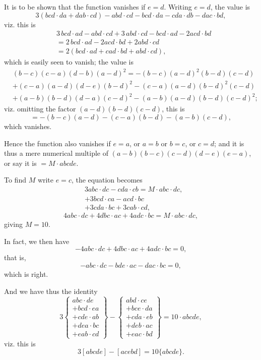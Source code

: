 \documentclass[12pt,a4paper]{article}
\theoremstyle{cayley}
\theoremstyle{definition}
\numberwithin{equation}{section}
\begin{document}
It is to be shown that the function vanishes if $e = d$. Writing $e = d$, the value is
\[
3(bcd \cdot da + dab \cdot cd) - abd \cdot cd - bcd \cdot da - cda \cdot db - dac \cdot bd,
\]
viz. this is
\begin{align*}
&3\, bcd \cdot ad - abd \cdot cd + 3\, abd \cdot cd - bcd \cdot ad - 2acd \cdot bd \\
&= 2\, bcd \cdot ad - 2acd \cdot bd + 2abd \cdot cd \\
&= 2(bcd \cdot ad + cad \cdot bd + abd \cdot cd),
\end{align*}
which is easily seen to vanish; the value is
\begin{align*}
&(b - c)(c - a)(d - b)(a - d)^2 = -(b - c)(a - d)^2(b - d)(c - d) \\
&+ (c - a)(a - d)(d - e)(b - d)^2 - (c - a)(a - d)(b - d)^2(c - d) \\
&+ (a - b)(b - d)(d - a)(c - d)^2 - (a - b)(a - d)(b - d)(c - d)^2;
\end{align*}
viz. omitting the factor $(a - d)(b - d)(c - d)$, this is
\[
= -(b - c)(a - d) - (c - a)(b - d) - (a - b)(c - d),
\]
which vanishes.

Hence the function also vanishes if $e = a$, or $a = b$ or $b = c$, or $c = d$; and it is thus a mere numerical multiple of $(a - b)(b - c)(c - d)(d - e)(e - a)$, or say it is $= M \cdot abcde$.

To find $M$ write $e = c$, the equation becomes
\begin{align*}
&3abc \cdot dc - cda \cdot cb = M \cdot abc \cdot dc, \\
&+ 3bcd \cdot ca - acd \cdot bc \\
&+ 3cda \cdot bc + 3cab \cdot cd,
\end{align*}
\[
4abc \cdot dc + 4dbc \cdot ac + 4adc \cdot bc = M \cdot abc \cdot dc,
\]
giving $M = 10$.

In fact, we then have
\[
-4abc \cdot dc + 4dbc \cdot ac + 4adc \cdot bc = 0,
\]
that is,
\[
-abc \cdot dc - bde \cdot ac - dac \cdot bc = 0,
\]
which is right.

And we have thus the identity
\[
3\left\{\begin{array}{l}
abc \cdot de \\
+ bcd \cdot ea \\
+ cde \cdot ab \\
+ dea \cdot bc \\
+ eab \cdot cd
\end{array}\right\}
-
\left\{\begin{array}{l}
abd \cdot ce \\
+ bce \cdot da \\
+ cda \cdot eb \\
+ deb \cdot ac \\
+ eac \cdot bd
\end{array}\right\}
= 10 \cdot abcde,
\]
viz. this is
\[
3[abcde] - [acebd] = 10\{abcde\}.
\]
\end{document}
